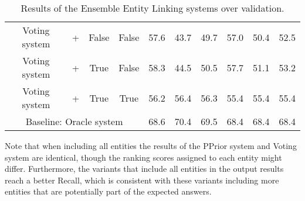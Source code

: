 \begin{table}[h!]
{\begin{tabular}{|c|ccc|ccc|ccc|}
    Voting system                    & +                                                                                                    & False                                                                                                     & False                              & 57.6                                 & 43.7                                    & 49.7              & 57.0                                   & 50.4                                    & 52.5              \\
    Voting system                    & +                                                                                                    & True                                                                                                      & False                              & 58.3                                 & 44.5                                    & 50.5              & 57.7                                 & 51.1                                    & 53.2              \\
    Voting system                    & +                                                                                                    & True                                                                                                      & True                      & 56.2                        & 56.4                           & 56.3     & 55.4                        & 55.4                           & 55.4     \\ \hline
    \multicolumn{4}{|c|}{Baseline: Oracle system}                                                                                                                                                                                                                                            & 68.6                                 & 70.4                                    & 69.5              & 68.4                                 & 68.4                                    & 68.4              \\ \hline
    \end{tabular}%
    }
    \caption{Results of the Ensemble Entity Linking systems over \LCQuADtwo{} validation.}
    \label{table:eelResultsLcquad2}
\end{table}

Note that when including all entities the results of the PPrior system and Voting system are 
identical, though the ranking scores assigned to each entity might differ. Furthermore, the 
variants that include all entities in the output results reach a better Recall, which is 
consistent with these variants including more entities that are potentially part of the expected 
answers.

